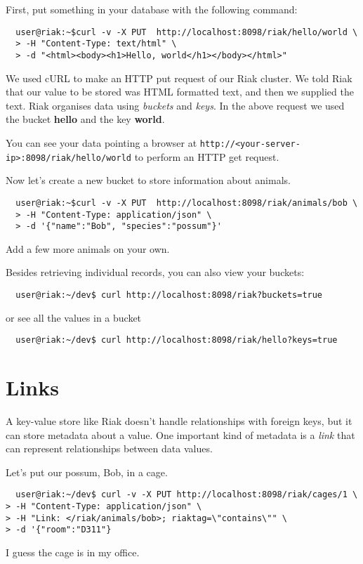 \documentclass{article}
\begin{document}
First, put something in your database with the following command:
\begin{verbatim}
  user@riak:~$curl -v -X PUT  http://localhost:8098/riak/hello/world \
  > -H "Content-Type: text/html" \
  > -d "<html><body><h1>Hello, world</h1></body></html>"
  \end{verbatim}

We used cURL to make an HTTP put request of our Riak cluster.  We told Riak that our value to be stored was HTML formatted text, and then we supplied the text.  Riak organises data using \emph{buckets} and \emph{keys}.  In the above request we used the bucket \textbf{hello} and the key \textbf{world}.

You can see your data pointing a browser at \texttt{http://<your-server-ip>:8098/riak/hello/world} to perform an HTTP get request. 

Now let's create a new bucket to store information about animals.
\begin{verbatim}
  user@riak:~$curl -v -X PUT  http://localhost:8098/riak/animals/bob \
  > -H "Content-Type: application/json" \
  > -d '{"name":"Bob", "species":"possum"}'
  \end{verbatim}
  
Add a few more animals on your own.

Besides retrieving individual records, you can also view your buckets:
\begin{verbatim}
  user@riak:~/dev$ curl http://localhost:8098/riak?buckets=true
\end{verbatim}
or see all the values in a bucket
\begin{verbatim}
  user@riak:~/dev$ curl http://localhost:8098/riak/hello?keys=true
\end{verbatim}

\section{Links}
A key-value store like Riak doesn't handle relationships with foreign keys, but it can store metadata about a value.  One important kind of metadata is a \emph{link} that can represent relationships between data values.

Let's put our possum, Bob, in a cage.
 \begin{verbatim}
  user@riak:~/dev$ curl -v -X PUT http://localhost:8098/riak/cages/1 \
> -H "Content-Type: application/json" \
> -H "Link: </riak/animals/bob>; riaktag=\"contains\"" \
> -d '{"room":"D311"}
\end{verbatim}
I guess the cage is in my office.
\end{document}
